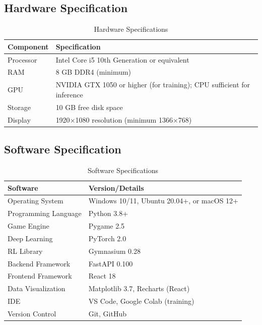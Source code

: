 \subsection{Hardware Specification}
\begin{table}[!ht]
\centering
\caption{Hardware Specifications}
\label{tab:hardware}
\begin{tabular}{|p{4cm}|p{8cm}|}
\hline
\textbf{Component} & \textbf{Specification}\\
\hline
Processor & Intel Core i5 10th Generation or equivalent\\
\hline
RAM & 8 GB DDR4 (minimum)\\
\hline
GPU & NVIDIA GTX 1050 or higher (for training); CPU sufficient for inference\\
\hline
Storage & 10 GB free disk space\\
\hline
Display & 1920$\times$1080 resolution (minimum 1366$\times$768)\\
\hline
\end{tabular}
\end{table}

\subsection{Software Specification}
\begin{table}[!ht]
\centering
\caption{Software Specifications}
\label{tab:software}
\begin{tabular}{|p{4cm}|p{8cm}|}
\hline
\textbf{Software} & \textbf{Version/Details}\\
\hline
Operating System & Windows 10/11, Ubuntu 20.04+, or macOS 12+\\
\hline
Programming Language & Python 3.8+\\
\hline
Game Engine & Pygame 2.5\\
\hline
Deep Learning & PyTorch 2.0\\
\hline
RL Library & Gymnasium 0.28\\
\hline
Backend Framework & FastAPI 0.100\\
\hline
Frontend Framework & React 18\\
\hline
Data Visualization & Matplotlib 3.7, Recharts (React)\\
\hline
IDE & VS Code, Google Colab (training)\\
\hline
Version Control & Git, GitHub\\
\hline
\end{tabular}
\end{table}
